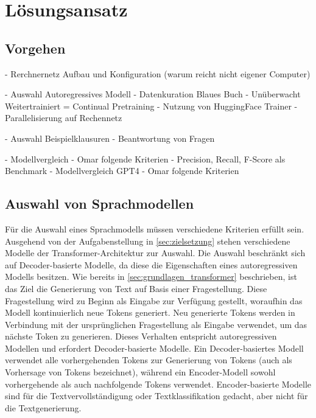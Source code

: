 \chapter{Lösungsansatz}\label{ch:approach}
\section*{Vorgehen}
- Rerchnernetz Aufbau und Konfiguration (warum reicht nicht eigener Computer)

- Auswahl Autoregressives Modell
- Datenkuration Blaues Buch
- Unüberwacht Weitertrainiert = Continual Pretraining
    - Nutzung von HuggingFace Trainer
    - Parallelisierung auf Rechennetz

- Auswahl Beispielklausuren
- Beantwortung von Fragen

- Modellvergleich
    - Omar folgende Kriterien
    - Precision, Recall, F-Score als Benchmark
- Modellvergleich GPT4
    - Omar folgende Kriterien

\section{Auswahl von Sprachmodellen}

Für die Auswahl eines Sprachmodells müssen verschiedene Kriterien erfüllt sein.
Ausgehend von der Aufgabenstellung in \ref{sec:zielsetzung} stehen verschiedene Modelle der Transformer-Architektur zur Auswahl.
Die Auswahl beschränkt sich auf Decoder-basierte Modelle, da diese die Eigenschaften eines autoregressiven Modells besitzen.
Wie bereits in \ref{sec:grundlagen_transformer} beschrieben, ist das Ziel die Generierung von Text auf Basis einer Fragestellung.
Diese Fragestellung wird zu Beginn als Eingabe zur Verfügung gestellt, woraufhin das Modell kontinuierlich neue Tokens generiert.
Neu generierte Tokens werden in Verbindung mit der ursprünglichen Fragestellung als Eingabe verwendet, um das nächste Token zu generieren.
Dieses Verhalten entspricht autoregressiven Modellen und erfordert Decoder-basierte Modelle.
Ein Decoder-basiertes Modell verwendet alle vorhergehenden Tokens zur Generierung von Tokens (auch als Vorhersage von Tokens bezeichnet), während ein Encoder-Modell sowohl vorhergehende als auch nachfolgende Tokens verwendet.
Encoder-basierte Modelle sind für die Textvervollständigung oder Textklassifikation gedacht, aber nicht für die Textgenerierung.\\

